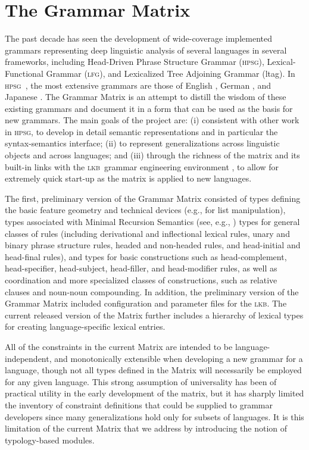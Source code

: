 \documentclass[11pt]{article}
\newcommand{\hpsg}{\textsc{hpsg}}
\newcommand{\lkb}{\textsc{lkb}}
\newcommand{\lfg}{\textsc{lfg}}
\begin{document}
\section{The Grammar Matrix}

The past decade has seen the development of wide-coverage implemented
grammars representing deep linguistic analysis of several languages in
several frameworks, including Head-Driven Phrase Structure Grammar
(\hpsg), Lexical-Functional Grammar (\lfg), and Lexicalized Tree
Adjoining Grammar ({\sc ltag}). In \hpsg\ \cite{Pol:Sag:94}, the most
extensive grammars are those of English \cite{Flickinger:00}, German
\cite{Mue:Kap:00}, and Japanese \cite{Siegel:00,Siegel:Bender:02}.
The Grammar Matrix \cite{Ben:Fli:Oe:02} is an attempt to distill the
wisdom of these existing grammars and document it in a form that can
be used as the basis for new grammars. The main goals of the project
are: (i) consistent with other work in \hpsg, to develop in detail
semantic representations and in particular the syntax-semantics
interface; (ii) to represent generalizations across linguistic objects
and across languages; and (iii) through the richness of the matrix and
its built-in links with the \lkb\ grammar engineering environment
\cite{Copestake:02}, to allow for extremely quick start-up as the
matrix is applied to new languages.

The first, preliminary version of the Grammar Matrix 
consisted of types defining the basic feature geometry and technical
devices (e.g., for list manipulation), types associated with Minimal
Recursion Semantics (see, e.g., \cite{Cop:Las:Fli:01}) types for
general classes of rules (including derivational and inflectional
lexical rules, unary and binary phrase structure rules, headed and
non-headed rules, and head-initial and head-final rules), and types
for basic constructions such as head-complement, head-specifier,
head-subject, head-filler, and head-modifier rules, as well as 
coordination and more specialized classes of constructions, such as relative
clauses and noun-noun compounding.  In addition, the preliminary
version of the Grammar Matrix included configuration and parameter
files for the \lkb.  The current released version of the Matrix further 
includes a hierarchy of lexical types for creating language-specific 
lexical entries.

All of the constraints in the current Matrix are intended to be 
language-independent, and monotonically extensible when developing a
new grammar for a language, though not all types defined in the Matrix
will necessarily be employed for any given language.  This strong 
assumption of universality has been of practical utility in the early
development of the matrix, but it has sharply limited the inventory of
constraint definitions that could be supplied to grammar developers
since many generalizations hold only for subsets of languages.  It is
this limitation of the current Matrix that we address by introducing
the notion of typology-based modules.
\end{document}
